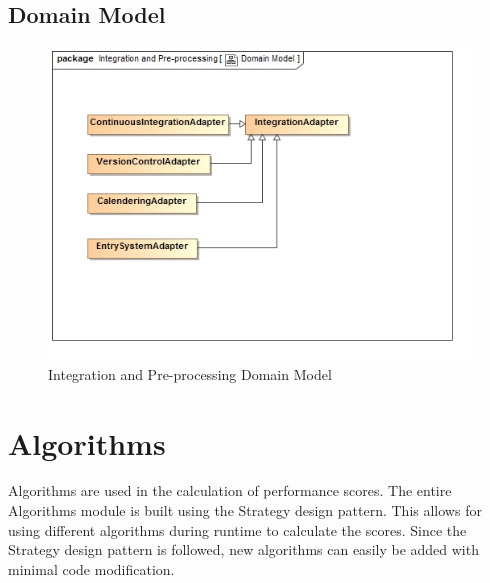\documentclass[11pt,a4paper]{article}
\begin{document}
\subsection{Domain Model}
\begin{figure}[H]
	\begin{center}
		\includegraphics[scale=0.75]{../Images/Integration Domain Model new.jpg}
		\caption{Integration and Pre-processing Domain Model}
	\end{center}
\end{figure}

\pagebreak

\section{Algorithms}

Algorithms are used in the calculation of performance scores. The entire Algorithms module is built using the Strategy design pattern. This allows for using different algorithms during runtime to calculate the scores. Since the Strategy design pattern is followed, new algorithms can easily be added with minimal code modification.
\end{document}
